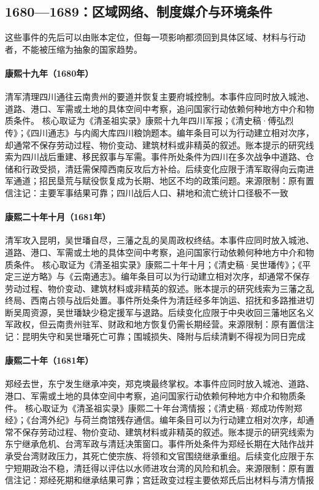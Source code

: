 \subsection{1680—1689：区域网络、制度媒介与环境条件}
这些事件的先后可以由账本定位，但每一项影响都须回到具体区域、材料与行动者，不能被压缩为抽象的国家趋势。
\hypertarget{civic:EQ-1680-SICHUAN-RECOVERY}{}\paragraph{康熙十九年（1680年）}清军清理四川通往云南贵州的要道并恢复主要府城控制。本事件应同时放入城池、道路、港口、军需或土地的具体空间中考察，追问国家行动依赖何种地方中介和物质条件。 核心取证为《清圣祖实录》康熙十九年四川军报；《清史稿·傅弘烈传》；《四川通志》与内阁大库四川粮饷题本。编年条目可以为行动建立相对次序，却通常不保存劳动过程、物价变动、建筑材料或非精英的叙述。账本提示的研究线索为四川战后重建、移民叙事与军需。事件所处条件为四川在多次战争中道路、仓储和行政受损，清廷需保障西南反攻后方补给。后续变化应限于清军取得向云南进军通道；招民垦荒与赋役恢复成为长期、地区不均的政策问题。来源限制：原有置信注记：主要军事结果可靠；四川战后人口、耕地和流亡统计口径极不一致
\hypertarget{civic:EQ-1681-KUNMING}{}\paragraph{康熙二十年十月（1681年）}清军攻入昆明，吴世璠自尽，三藩之乱的吴周政权终结。本事件应同时放入城池、道路、港口、军需或土地的具体空间中考察，追问国家行动依赖何种地方中介和物质条件。 核心取证为《清圣祖实录》康熙二十年十月；《清史稿·吴世璠传》；《平定三逆方略》与《云南通志》。编年条目可以为行动建立相对次序，却通常不保存劳动过程、物价变动、建筑材料或非精英的叙述。账本提示的研究线索为三藩之乱终局、西南占领与战后处置。事件所处条件为清廷经多年饷运、招抚和多路推进切断吴周资源，吴世璠缺少稳定援军与退路。后续变化应限于中央收回三藩地区名义军政权，但云南贵州驻军、财政和地方恢复仍需长期经营。来源限制：原有置信注记：昆明失守和吴世璠死亡可靠；围城损失、降附与后续清剿不得视为同日完成
\hypertarget{civic:EQ-1681-ZHENG-JING-DEATH}{}\paragraph{康熙二十年（1681年）}郑经去世，东宁发生继承冲突，郑克塽最终掌权。本事件应同时放入城池、道路、港口、军需或土地的具体空间中考察，追问国家行动依赖何种地方中介和物质条件。 核心取证为《清圣祖实录》康熙二十年台湾情报；《清史稿·郑成功传附郑经》；《台湾外纪》与荷兰商馆残存通信。编年条目可以为行动建立相对次序，却通常不保存劳动过程、物价变动、建筑材料或非精英的叙述。账本提示的研究线索为东宁继承危机、台湾军政与清廷决策窗口。事件所处条件为郑经长期在大陆作战并承受台湾财政压力，其死亡使宗族、将领和文官围绕继承重组。后续变化应限于东宁短期政治不稳，清廷得以评估以水师进攻台湾的风险和机会。来源限制：原有置信注记：郑经死期和继承结果可靠；宫廷政变过程主要依郑氏后出材料与清方情报
